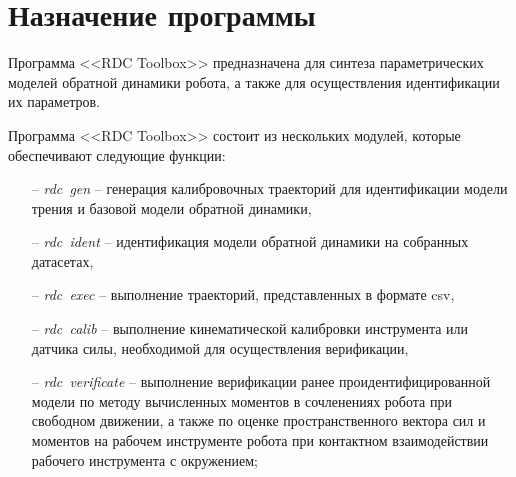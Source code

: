 \newpage
\section{Назначение программы}


Программа <<RDC Toolbox>> предназначена для синтеза параметрических моделей обратной динамики робота, а также для осуществления идентификации их параметров.

Программа <<RDC Toolbox>> состоит из нескольких модулей, которые обеспечивают следующие функции:
\begin{enumerate}
    \item[--] \textit{rdc~gen} -- генерация калибровочных траекторий для идентификации модели трения и базовой модели обратной динамики,
    \item[--] \textit{rdc~ident} -- идентификация модели обратной динамики на собранных датасетах,
    \item[--] \textit{rdc~exec} -- выполнение траекторий, представленных в формате csv,
    \item[--] \textit{rdc~calib} -- выполнение кинематической калибровки инструмента или датчика силы, необходимой для осуществления верификации,
    \item[--] \textit{rdc~verificate} -- выполнение верификации ранее проидентифицированной модели по методу вычисленных моментов в сочленениях робота при свободном движении, а также по оценке пространственного вектора сил и моментов на рабочем инструменте робота при контактном взаимодействии рабочего инструмента с окружением;
\end{enumerate}